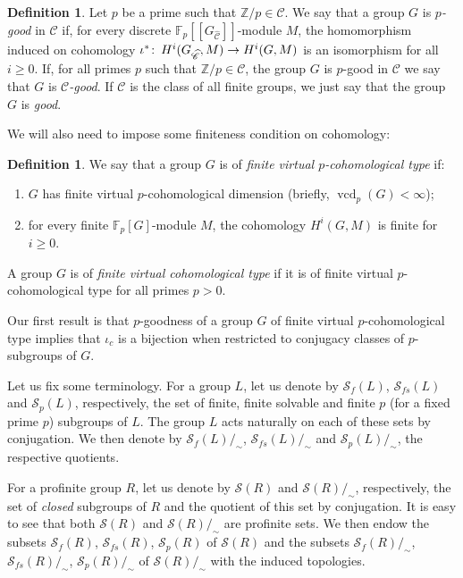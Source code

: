 \documentclass[12pt,twoside]{amsart}
\newcommand\Z{{\mathbb Z}}
\newcommand\F{{\mathbb F}}
\newcommand\cC{{\mathscr C}}
\newcommand\cS{{\mathscr S}}
\def\co{\colon\thinspace}
\newcommand\vcd{\operatorname{vcd}}
\def\wC{{\widehat{\cC}}}
\theoremstyle{definition}
\newtheorem{definition}[theorem]{Definition}
\begin{document}
\begin{definition}\label{good group}Let $p$ be a prime such that $\Z/p\in\cC$.
We say that a group $G$ is \emph{$p$-good} in $\cC$ if, for every discrete $\F_p[[G_\wC]]$-module $M$, 
the homomorphism induced on cohomology $\iota^\ast\co H^i(G_\wC,M)\to H^i(G,M)$ is an isomorphism for all $i\geq 0$.
If, for all primes $p$ such that $\Z/p\in\cC$, the group $G$ is $p$-good in $\cC$ we say that $G$ is \emph{$\cC$-good}. 
If $\cC$ is the class of all finite groups, we just say that the group $G$ is \emph{good}.
\end{definition}

We will also need to impose some finiteness condition on cohomology:

\begin{definition}\label{fct}We say that a group $G$ is of \emph{finite virtual $p$-cohomological type} if:
\begin{enumerate}
\item $G$ has finite virtual $p$-cohomological dimension (briefly, $\vcd_p(G)<\infty$);
\item for every finite $\F_p[G]$-module $M$, the cohomology $H^i(G,M)$ is finite for $i\geq 0$.
\end{enumerate}
A group $G$ is of \emph{finite virtual cohomological type} if it is of finite virtual $p$-cohomological type for all primes $p>0$.
\end{definition}

Our first result is that $p$-goodness of a group $G$ of finite virtual $p$-cohomological type implies that $\iota_c$ is a bijection
when restricted to conjugacy classes of $p$-subgroups of $G$. 

Let us fix some terminology. For a group $L$, let us denote by $\cS_f(L)$, $\cS_{f\!s}(L)$ and $\cS_p(L)$, respectively, the set of finite,
finite solvable and finite $p$ (for a fixed prime $p$) subgroups of $L$. The group $L$ acts naturally on each of these sets by conjugation. 
We then denote by $\cS_f(L)/_{\sim}$, $\cS_{f\!s}(L)/_{\sim}$ and $\cS_p(L)/_{\sim}$, the respective quotients.

For a profinite group $R$, let us denote by $\cS(R)$ and $\cS(R)/_{\sim}$, respectively, the set of \emph{closed} subgroups of $R$ 
and the quotient of this set by conjugation. It is easy to see that both $\cS(R)$ and $\cS(R)/_{\sim}$ are profinite sets. We then endow the subsets 
$\cS_f(R)$, $\cS_{f\!s}(R)$, $\cS_p(R)$ of $\cS(R)$ and the subsets $\cS_f(R)/_{\sim}$, $\cS_{f\!s}(R)/_{\sim}$, $\cS_p(R)/_{\sim}$ of $\cS(R)/_{\sim}$ 
with the induced topologies. 
\end{document}
